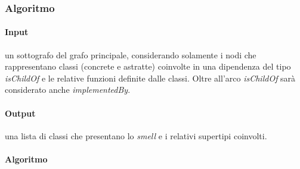     
    \subsubsection{Algoritmo}
        \paragraph{Input} un sottografo del grafo principale, considerando solamente i nodi che rappresentano classi (concrete e astratte) coinvolte in una dipendenza del tipo \textit{isChildOf} e le relative funzioni definite dalle classi. Oltre all'arco \textit{isChildOf} sarà considerato anche \textit{implementedBy}.
    
        \paragraph{Output} una lista di classi che presentano lo \textit{smell} e i relativi supertipi coinvolti.
        
        \paragraph{Algoritmo}
            
    
